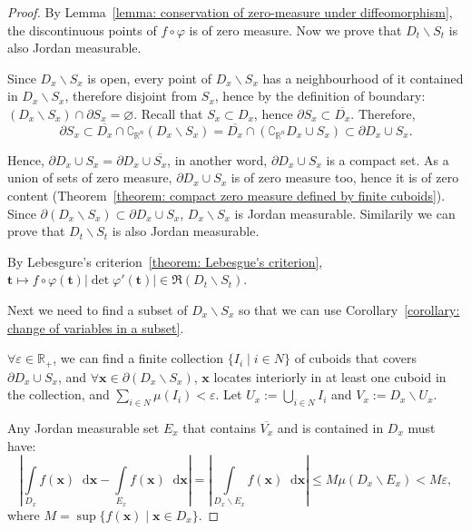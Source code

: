 \documentclass[openany]{book}
\theoremstyle{plain}
\theoremstyle{definition}
\newcommand{\dif}{\mathop{}\!\mathrm{d}} %
\newcommand*{\bv}{\boldsymbol} %
\begin{document}
\begin{proof}
	By Lemma~\ref{lemma: conservation of zero-measure under diffeomorphism}, the discontinuous points of $f \circ \varphi$ is of zero measure. 
	Now we prove that $D_t \backslash S_t$ is also Jordan measurable.

	Since $D_x \backslash S_x$ is open, every point of $D_x \backslash S_x$ has a neighbourhood of it contained in $D_x \backslash S_x$, therefore disjoint from $S_x$, hence by the definition of boundary: $(D_x \backslash S_x) \cap \partial S_x = \varnothing$. 
	Recall that $S_x \subset D_x$, hence $\partial S_x \subset \overline{D_x}$. 
	Therefore, 
	\begin{equation*}
		\partial S_x 
		\subset \overline{D_x} \cap \complement_{\mathbb R^n} (D_x \backslash S_x) 
		= \overline{D_x} \cap (\complement_{\mathbb R^n} D_x \cup S_x)
		\subset \partial D_x \cup S_x.
	\end{equation*}

	Hence, $\partial D_x \cup S_x = \partial D_x \cup \overline{S_x}$, in another word, $\partial D_x \cup S_x$ is a compact set. 
	As a union of sets of zero measure, $\partial D_x \cup S_x$ is of zero measure too, hence it is of zero content (Theorem~\ref{theorem: compact zero measure defined by finite cuboids}). 
	Since $\partial (D_x \backslash S_x) \subset \partial D_x \cup S_x$, $D_x \backslash S_x$ is Jordan measurable. 
	Similarily we can prove that $D_t \backslash S_t$ is also Jordan measurable.

	By Lebesgure's criterion~\ref{theorem: Lebesgue's criterion}, $\bv t \mapsto f \circ \varphi(\bv t) |\det \varphi'(\bv t)| \in \mathfrak R(D_t \backslash S_t)$. 
	
	Next we need to find a subset of $D_x \backslash S_x$ so that we can use Corollary~\ref{corollary: change of variables in a subset}.

	$\forall \varepsilon \in \mathbb R_+$, we can find a finite collection $\{I_i \mid i \in N\}$ of cuboids that covers $\partial D_x \cup S_x$, and $\forall \bv x \in \partial (D_x \backslash S_x)$, $\bv x$ locates interiorly in at least one cuboid in the collection, and $\sum_{i \in N} \mu(I_i) < \varepsilon$. 
	Let $U_x := \bigcup_{i \in N} I_i$ and $V_x := D_x \backslash U_x$.

	Any Jordan measurable set $E_x$ that contains $\overline{V_x}$ and is contained in $D_x$ must have:
	\begin{equation*}
		\left|
			\int\limits_{D_x} f(\bv x) \dif \bv x - \int\limits_{E_x} f(\bv x) \dif \bv x
		\right|
		 = \left|
		 \int\limits_{D_x \backslash E_x} f(\bv x) \dif \bv x
	 \right| \leq M \mu(D_x \backslash E_x) < M \varepsilon,
	\end{equation*}
	where $M = \sup \{f(\bv x) \mid \bv x \in D_x\}$.


\end{proof}
\end{document}
